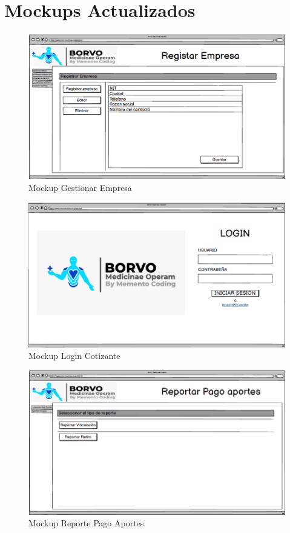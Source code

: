 \documentclass[12pt,a4paper]{article}
\begin{document}
\section{Mockups Actualizados}
\begin{figure}[H]
\centering
{\includegraphics[width=1\textwidth]{Mockup_1.png}\par}
\caption{Mockup Gestionar Empresa}
\end{figure}
\begin{figure}[H]
\centering
{\includegraphics[width=1\textwidth]{Mockup_2.png}\par}
\caption{Mockup Login Cotizante}
\end{figure}
\begin{figure}[H]
\centering
{\includegraphics[width=1\textwidth]{Mockup_3.png}\par}
\caption{Mockup Reporte Pago Aportes}
\end{figure}
\end{document}
